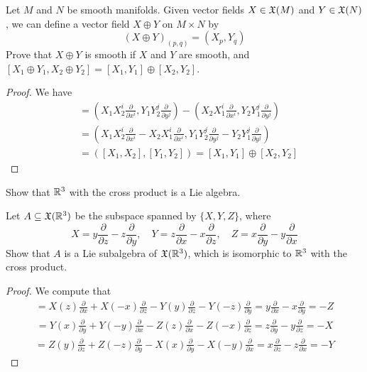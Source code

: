 \begin{exercise}\label{vector field direct sum}
Let $M$ and $N$ be smooth manifolds. Given vector fields $X\in\mathfrak{X}(M)$ and $Y\in\mathfrak{X}(N)$, we can define a vector field $X\oplus Y$ on $M\times N$ by
\[(X\oplus Y)_{(p,q)}=(X_p,Y_q)\]
Prove that $X\oplus Y$ is smooth if $X$ and $Y$ are smooth, and $[X_1\oplus Y_1,X_2\oplus Y_2]=[X_1,Y_1]\oplus[X_2,Y_2]$.
\end{exercise}
\begin{proof}
We have
\begin{align*}
[X_1\oplus Y_1,X_2\oplus Y_2]&=(X_1X_2^i\frac{\partial}{\partial x^i},Y_1Y_2^j\frac{\partial}{\partial y^j})-(X_2X_1^i\frac{\partial}{\partial x^i},Y_2Y_1^j\frac{\partial}{\partial y^j})\\
&=(X_1X_2^i\frac{\partial}{\partial x^i}-X_2X_1^i\frac{\partial}{\partial x^i},Y_1Y_2^j\frac{\partial}{\partial y^j}-Y_2Y_1^j\frac{\partial}{\partial y^j})\\
&=([X_1,X_2],[Y_1,Y_2])=[X_1,Y_1]\oplus[X_2,Y_2]
\end{align*}
\end{proof}
\begin{exercise}
Show that $\mathbb{R}^3$ with the cross product is a Lie algebra.
\end{exercise}
\begin{exercise}
Let $A\subseteq\mathfrak{X}(\mathbb{R}^3)$ be the subspace spanned by $\{X,Y,Z\}$, where
\[X=y\frac{\partial}{\partial z}-z\frac{\partial}{\partial y},\quad Y=z\frac{\partial}{\partial x}-x\frac{\partial}{\partial z},\quad Z=x\frac{\partial}{\partial y}-y\frac{\partial}{\partial x} \]
Show that $A$ is a Lie subalgebra of $\mathfrak{X}(\mathbb{R}^3)$, which is isomorphic to $\mathbb{R}^3$ with the cross product.
\end{exercise}
\begin{proof}
We compute that
\begin{align*}
[X,Y]=X(z)\frac{\partial}{\partial x}+X(-x)\frac{\partial}{\partial z}-Y(y)\frac{\partial}{\partial z}-Y(-z)\frac{\partial}{\partial y}=y\frac{\partial}{\partial x}-x\frac{\partial}{\partial y}=-Z
\end{align*}
\begin{align*}
[Y,Z]=Y(x)\frac{\partial}{\partial y}+Y(-y)\frac{\partial}{\partial x}-Z(z)\frac{\partial}{\partial x}-Z(-x)\frac{\partial}{\partial z}=z\frac{\partial}{\partial y}-y\frac{\partial}{\partial z}=-X
\end{align*}
\begin{align*}
[Z,X]=Z(y)\frac{\partial}{\partial z}+Z(-z)\frac{\partial}{\partial y}-X(x)\frac{\partial}{\partial y}-X(-y)\frac{\partial}{\partial x}=x\frac{\partial}{\partial z}-z\frac{\partial}{\partial x}=-Y
\end{align*}
\end{proof}
